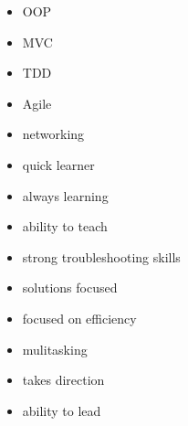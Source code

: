 \documentclass[letterpaper]{article}        %
\begin{document}
\begin{multicols}{3}
      \begin{itemize}
            
      \end{itemize}
    
      \begin{itemize}
            
      \end{itemize}
    
      \begin{itemize}
        \item OOP
        \item MVC
        \item TDD
        \item Agile
        
      \end{itemize}
    
      \begin{itemize}
        \item networking
        \item quick learner
        \item always learning
        \item ability to teach
        \item strong troubleshooting skills
        \item solutions focused
        \item focused on efficiency
        \item mulitasking
        \item takes direction
        \item ability to lead
        
      \end{itemize}
    
    
  \end{multicols}
\end{document}
